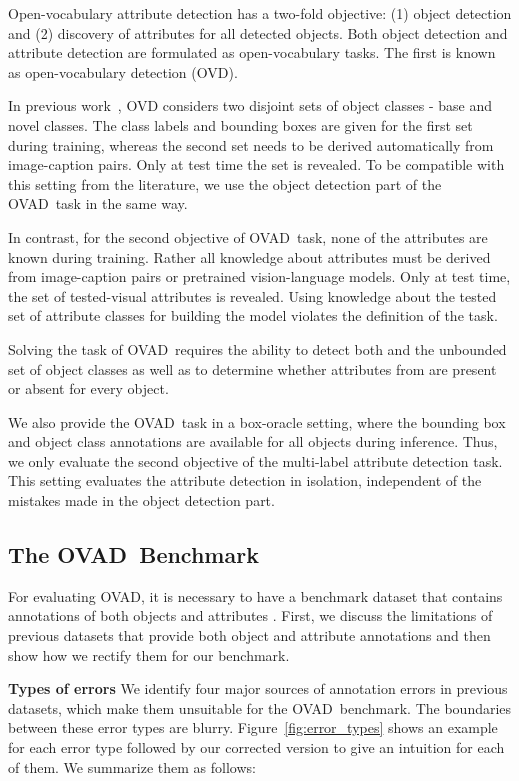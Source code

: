 \documentclass[10pt,twocolumn,letterpaper]{article}
\renewcommand\paragraph[1]{\vspace{0.12cm}\noindent\textbf{#1}}
\newcommand{\datasetname}{OVAD}
\newcommand{\taskname}{OVAD}
\begin{document}
Open-vocabulary attribute detection has a two-fold objective: (1) object detection and (2) discovery of attributes for all detected objects. 
Both object detection and attribute detection are formulated as open-vocabulary tasks. The first is known as open-vocabulary detection (OVD).

In previous work~\cite{ovr_baseline}, OVD considers two disjoint sets of object classes - base  and novel  classes. 
The class labels and bounding boxes are given for the first set  during training, whereas the second set  needs to be derived automatically from image-caption pairs. Only at test time the set  is revealed. To be compatible with this setting from the literature, we use the object detection part of the \taskname\ task in the same way. 

In contrast, for the second objective of \taskname\ task, none of the attributes are known during training. Rather all knowledge about attributes must be derived from image-caption pairs or pretrained vision-language models. Only at test time, the set of tested-visual attributes  is revealed. Using knowledge about the tested set of attribute classes for building the model violates the definition of the task. 

Solving the task of \taskname\ requires the ability to detect both  and the unbounded  set of object classes as well as to determine whether attributes from  are present or absent for every object. 

We also provide the \taskname\ task in a box-oracle setting, where the bounding box and object class annotations are available for all objects during inference. Thus, we only evaluate the second objective of the multi-label attribute detection task. This setting evaluates the attribute detection in isolation, independent of the mistakes made in the object detection part. 
 \subsection{The \datasetname\ Benchmark}
\label{sec:ova_benchmark}
For evaluating \taskname, it is necessary to have a benchmark dataset that contains annotations of both objects  and attributes . 
First, we discuss the limitations of previous datasets that provide both object and attribute annotations and then show how we rectify them for our benchmark.

\paragraph{Types of errors} We identify four major sources of annotation errors in previous datasets, which make them unsuitable for the \datasetname\ benchmark. The boundaries between these error types are blurry. 
Figure~\ref{fig:error_types} shows an example for each error type followed by our corrected version to give an intuition for each of them. We summarize them as follows:  
\end{document}
